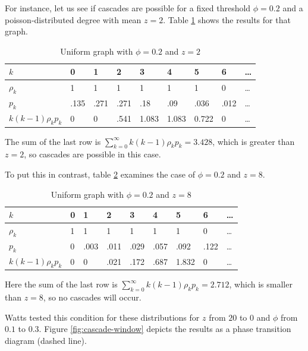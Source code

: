 \documentclass{sig-alternate-05-2015}
\begin{document}
For instance, let us see if cascades are possible for a fixed threshold $\phi = 0.2$ and a poisson-distributed degree with mean $z = 2$. Table \ref{tab:z2} shows the results for that graph.

\begin{table}[t!]
\centering
\caption{Uniform graph with $\phi = 0.2$ and $z = 2$}
\label{tab:z2}
\begin{tabular}{|l|l|l|l|l|l|l|l|l|}
\hline
$k$                       & 0     & 1      & 2     & 3      & 4      & 5      & 6     & \ldots\\ \hline
$\rho_k$                  & 1     & 1      & 1     & 1      & 1      & 1      & 0     & \ldots\\ \hline
$p_k$                     & .135  & .271   & .271  & .18    & .09    & .036   & .012  & \ldots\\ \hline
$k (k-1) \rho_k p_k$      & 0     & 0      & .541  & 1.083  & 1.083  & 0.722  & 0     & \ldots\\ \hline
\end{tabular}
\end{table}

The sum of the last row is $\sum_{k=0}^\infty k (k-1) \rho_k p_k = 3.428$, which is greater than $z = 2$, so cascades are possible in this case.

To put this in contrast, table \ref{tab:z8} examines the case of $\phi = 0.2$ and $z = 8$.

\begin{table}
\centering
\caption{Uniform graph with $\phi = 0.2$ and $z = 8$}
\label{tab:z8}
\begin{tabular}{|l|l|l|l|l|l|l|l|l|}
\hline
$k$                       & 0  & 1     & 2     & 3     & 4     & 5      & 6     & \ldots\\ \hline
$\rho_k$                  & 1  & 1     & 1     & 1     & 1     & 1      & 0     & \ldots\\ \hline
$p_k$                     & 0  & .003  & .011  & .029  & .057  & .092   & .122  & \ldots\\ \hline
$k (k-1) \rho_k p_k$      & 0  & 0     & .021  & .172  & .687  & 1.832  & 0     & \ldots\\ \hline
\end{tabular}
\end{table}

Here the sum of the last row is $\sum_{k=0}^\infty k (k-1) \rho_k p_k = 2.712$, which is smaller than $z = 8$, so no cascades will occur.

Watts tested this condition for these distributions for $z$ from $20$ to $0$ and $\phi$ from $0.1$ to $0.3$. Figure \ref{fig:cascade-window} depicts the results as a phase transition diagram (dashed line).
\end{document}

